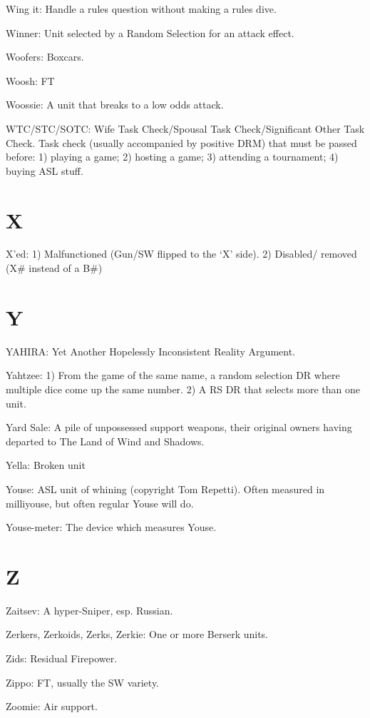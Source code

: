 \documentclass[letterpaper]{article}
\begin{document}
Wing it: Handle a rules question without making a rules dive.

Winner: Unit selected by a Random Selection for an attack effect.

Woofers: Boxcars.

Woosh: FT

Woossie: A unit that breaks to a low odds attack.

WTC/STC/SOTC:  Wife Task Check/Spousal Task Check/Significant Other Task Check.  Task check (usually accompanied by positive DRM) that must be passed before:  1) playing a game; 2) hosting a game; 3) attending a tournament; 4) buying ASL stuff.

\section{X}

X'ed: 1) Malfunctioned (Gun/SW flipped to the `X' side). 2) Disabled/ removed
(X\# instead of a B\#)

\section{Y}

YAHIRA: Yet Another Hopelessly Inconsistent Reality Argument.

Yahtzee: 1) From the game of the same name, a random selection DR where multiple dice come up the same number. 2) A RS DR that selects more than one unit.

Yard Sale:  A pile of unpossessed support weapons, their original owners having departed to The Land of Wind and Shadows.

Yella: Broken unit

Youse: ASL unit of whining (copyright Tom Repetti). Often measured in milliyouse, but often regular Youse will do.

Youse-meter: The device which measures Youse.

\section{Z}

Zaitsev: A hyper-Sniper, esp. Russian.

Zerkers, Zerkoids, Zerks, Zerkie: One or more Berserk units.

Zids: Residual Firepower.

Zippo:  FT, usually the SW variety.

Zoomie: Air support.
\end{document}
